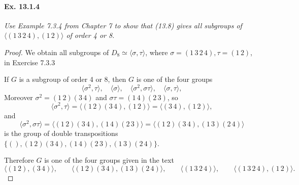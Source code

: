 \documentclass[11pt,a4paper]{article}
\begin{document}
\paragraph{Ex. 13.1.4}

{\it Use Example 7.3.4 from Chapter 7 to show that (13.8) gives all subgroups of $\langle (1\,3\,2\,4), (1\,2)\rangle$ of order 4 or 8.
}

\begin{proof}
We obtain all subgroups of $D_8  \simeq \langle \sigma,\tau \rangle$, where $\sigma =  (1\,3\,2\,4), \tau = (1\,2)$, in Exercise 7.3.3

\begin{center}
\end{center}

If $G$ is a subgroup of order 4 or 8, then $G$ is one of the four groups
$$\langle \sigma^2, \tau \rangle, \quad \langle \sigma \rangle,\quad \langle \sigma^2, \sigma  \tau  \rangle, \quad \langle \sigma,\tau\rangle,$$
Moreover $\sigma^2 = (1\,2)(3\,4)$ and $\sigma \tau = (1\,4)(2\,3)$, so 
$$\langle \sigma^2, \tau \rangle = \langle (1\,2)(3\,4), (1\,2) \rangle =  \langle (3\,4), (1\,2) \rangle,$$
and
$$\langle \sigma^2, \sigma  \tau  \rangle = \langle (1\,2)(3\,4),  (1\,4)(2\,3) \rangle =  \langle (1\,2)(3\,4),  (1\,3)(2\,4) \rangle$$
is the group of double transpositions $\{(), (1\,2)(3\,4), (1\,4)(2\,3), (1\,3)(2\,4)\}$.

Therefore $G$ is one of the four groups given in the text
$$\langle (1\,2),(3\,4) \rangle,\qquad  \langle (1\,2)(3\,4),  (1\,3)(2\,4) \rangle,\qquad  \langle (1\,3\,2\,4) \rangle, \qquad \langle (1\,3\,2\,4), (1\,2)  \rangle.$$
\end{proof}
\end{document}
